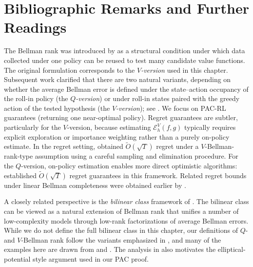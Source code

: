\section{Bibliographic Remarks and Further Readings}\label{ch7:bib}

The Bellman rank was introduced by \citet{jiang2017contextual} as a structural condition
under which data collected under one policy can be reused to test many candidate value functions.
The original formulation corresponds to the \emph{$V$-version} used in this chapter.
Subsequent work clarified that there are two natural variants, depending on whether the
average Bellman error is defined under the state--action occupancy of the roll-in policy
(the \emph{$Q$-version}) or under roll-in states paired with the greedy action of the tested
hypothesis (the \emph{$V$-version}); see \citet{bilinear,jin2021bellman}.
We focus on PAC-RL guarantees (returning one near-optimal policy). Regret guarantees are
subtler, particularly for the $V$-version, because estimating $\mathcal{E}_h^V(f,g)$ typically
requires explicit exploration or importance weighting rather than a purely on-policy estimate.
In the regret setting, \citet{dong2020root} obtained $\widetilde{O}(\sqrt{T})$ regret under a
$V$-Bellman-rank-type assumption using a careful sampling and elimination procedure.
For the $Q$-version, on-policy estimation enables more direct optimistic algorithms:
\citet{jin2021bellman} established $\widetilde{O}(\sqrt{T})$ regret guarantees in this framework.
Related regret bounds under linear Bellman completeness were obtained earlier by
\citet{zanette2020learning}.

A closely related perspective is the \emph{bilinear class} framework of \citet{bilinear}.
The bilinear class can be viewed as a natural extension of Bellman rank that unifies a
number of low-complexity models through low-rank factorizations of average Bellman errors.
While we do not define the full bilinear class in this chapter, our definitions of $Q$- and
$V$-Bellman rank follow the variants emphasized in \citet{bilinear,jin2021bellman}, and many of the
examples here are drawn from \citet{jiang2017contextual} and \citet{bilinear}.
The analysis in \citet{bilinear} also motivates the elliptical-potential style argument used in our
PAC proof.

